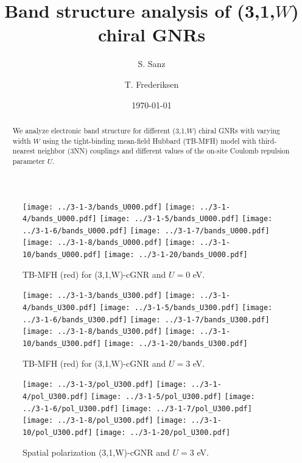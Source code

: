 \documentclass[twocolumn,amsmath,%
amssymb,prb,superscriptaddress]{revtex4}
\begin{document}
\title{Band structure analysis of (3,1,$W$) chiral GNRs}

\author{S. Sanz}

\author{T. Frederiksen}

\date{\today}

\begin{abstract}
We analyze electronic band structure for different (3,1,$W$) chiral GNRs with varying width 
$W$ using the tight-binding mean-field Hubbard (TB-MFH) model 
with third-nearest neighbor (3NN) couplings and
different values of the on-site Coulomb repulsion parameter $U$.
\end{abstract}

\maketitle

\begin{figure*}
	\texttt{[image: ../3-1-3/bands\_U000.pdf]}
	\texttt{[image: ../3-1-4/bands\_U000.pdf]}
	\texttt{[image: ../3-1-5/bands\_U000.pdf]}
	\texttt{[image: ../3-1-6/bands\_U000.pdf]}
	\texttt{[image: ../3-1-7/bands\_U000.pdf]}
	\texttt{[image: ../3-1-8/bands\_U000.pdf]}
	\texttt{[image: ../3-1-10/bands\_U000.pdf]}
	\texttt{[image: ../3-1-20/bands\_U000.pdf]}
	\caption{TB-MFH (red) for (3,1,W)-cGNR and $U=0$ eV.} 
\end{figure*}

\begin{figure*}
	\texttt{[image: ../3-1-3/bands\_U300.pdf]}
	\texttt{[image: ../3-1-4/bands\_U300.pdf]}
	\texttt{[image: ../3-1-5/bands\_U300.pdf]}
	\texttt{[image: ../3-1-6/bands\_U300.pdf]}
	\texttt{[image: ../3-1-7/bands\_U300.pdf]}
	\texttt{[image: ../3-1-8/bands\_U300.pdf]}
	\texttt{[image: ../3-1-10/bands\_U300.pdf]}
	\texttt{[image: ../3-1-20/bands\_U300.pdf]}
	\caption{TB-MFH (red) for (3,1,W)-cGNR and $U=3$ eV.} 
\end{figure*}

\begin{figure*}
	\texttt{[image: ../3-1-3/pol\_U300.pdf]}
	\texttt{[image: ../3-1-4/pol\_U300.pdf]}
	\texttt{[image: ../3-1-5/pol\_U300.pdf]}
	\texttt{[image: ../3-1-6/pol\_U300.pdf]}
	\texttt{[image: ../3-1-7/pol\_U300.pdf]}
	\texttt{[image: ../3-1-8/pol\_U300.pdf]}
	\texttt{[image: ../3-1-10/pol\_U300.pdf]}
	\texttt{[image: ../3-1-20/pol\_U300.pdf]}
	\caption{Spatial polarization (3,1,W)-cGNR and $U=3$ eV.} 
\end{figure*}
	

\end{document}
